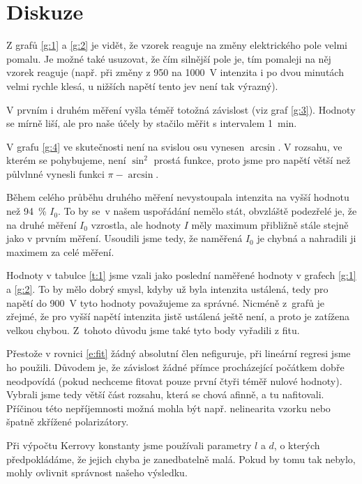 \section*{Diskuze}
Z grafů \ref{g:1} a \ref{g:2} je vidět, že vzorek reaguje na změny elektrického pole velmi pomalu. Je možné také usuzovat, že čím silnější pole je, tím pomaleji na něj vzorek reaguje (např. při změny z 950 na \SI{1000}{\volt} intenzita i po dvou minutách velmi rychle klesá, u nižších napětí tento jev není tak výrazný). 

V prvním i druhém měření vyšla téměř totožná závislost (viz graf \ref{g:3}). Hodnoty se mírně liší, ale pro naše účely by stačilo měřit s intervalem \SI{1}{\minute}.

V grafu \ref{g:4} ve skutečnosti není na svislou osu vynesen $\arcsin$. V rozsahu, ve kterém se pohybujeme, není $\sin^2$ prostá funkce, proto jsme pro napětí větší než půlvlnné vynesli funkci $\pi-\arcsin$.

Během celého průběhu druhého měření nevystoupala intenzita na vyšší hodnotu než \SI{94}{\percent} $I_0$. To by se~v našem uspořádání nemělo stát, obvzláště podezřelé je, že na druhé měření $I_0$ vzrostla, ale hodnoty $I$ měly maximum přibližně stále stejně jako v prvním měření. Usoudili jsme tedy, že naměřená $I_0$ je chybná a nahradili ji maximem za celé měření.

Hodnoty v tabulce \ref{t:1} jsme vzali jako poslední naměřené hodnoty v grafech \ref{g:1} a \ref{g:2}. To by mělo dobrý smysl, kdyby už byla intenzita ustálená, tedy pro napětí do \SI{900}{\volt} tyto hodnoty považujeme za správné. Nicméně z~grafů je zřejmé, že pro vyšší napětí intenzita jistě ustálená ještě není, a proto je zatížena velkou chybou.
Z~tohoto důvodu jsme také tyto body vyřadili z fitu.

Přestože v rovnici \eqref{e:fit} žádný absolutní člen nefiguruje, při lineární regresi jsme ho použili. Důvodem je, že závislost žádné přímce procházející počátkem dobře neodpovídá (pokud nechceme fitovat pouze první čtyři téměř nulové hodnoty). Vybrali jsme tedy větší část rozsahu, která se chová afinně, a tu nafitovali. Příčinou této nepříjemnosti možná mohla být např. nelinearita vzorku nebo špatně zkřížené polarizátory.

Při výpočtu Kerrovy konstanty jsme používali parametry $l$ a $d$, o kterých předpokládáme, že jejich chyba je zanedbatelně malá. Pokud by tomu tak nebylo, mohly ovlivnit správnost našeho výsledku.